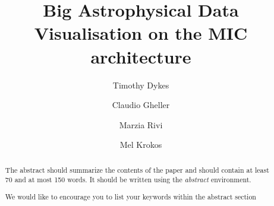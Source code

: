 \documentclass[runningheads,a4paper]{llncs}
\newcommand{\keywords}[1]{\par\addvspace\baselineskip
\noindent\keywordname\enspace\ignorespaces#1}
\begin{document}
\mainmatter  %

\title{Big Astrophysical Data Visualisation on the MIC architecture}


%
%
\author{Timothy Dykes
\and Claudio Gheller
\and Marzia Rivi
\and Mel Krokos
}
%

\institute{   
   University of Portsmouth,
   Portsmouth, U.K.\\
\mailsa\\
\and
  CSCS-ETHZ,
  Lugano, Switzerland\\
  \email{cgheller@cscs.ch}
\and
   University of Oxford,
   Oxford, U.K.\\
   \email{rivi@physics.ox.ac.uk}\\
}
%
%

\maketitle


\begin{abstract}
The abstract should summarize the contents of the paper and should
contain at least 70 and at most 150 words. It should be written using the
\emph{abstract} environment.
\keywords{We would like to encourage you to list your keywords within
the abstract section}
\end{abstract}
\end{document}
